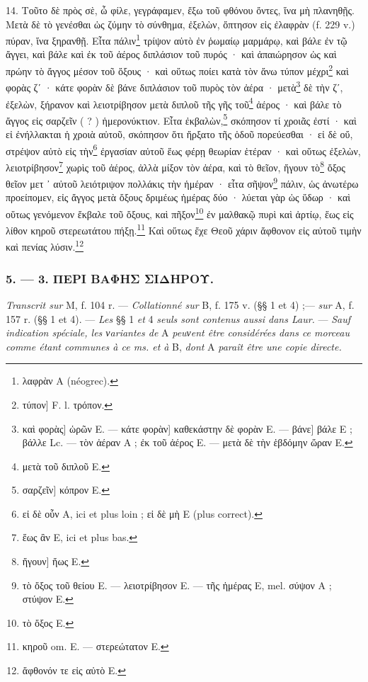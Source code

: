 \documentclass[a4paper, 11pt, oneside, polutonikogreek, french]{article}
\begin{document}
14. Τοῦτο δὲ πρὸς σὲ, ὦ φίλε, γεγράφαμεν, ἔξω τοῦ φθόνου ὄντες, ἵνα μὴ πλανηθῇς. Μετὰ δὲ τὸ γενέσθαι ὡς ζύμην τὸ σύνθημα, ἐξελὼν, ὄπτησον εἰς ἐλαφρὰν (f. 229 v.) πύραν, ἵνα ξηρανθῇ. Εἶτα πάλιν\footnote{λαφρὰν A (néogrec).} τρίψον αὐτὸ ἐν ῥωμαίῳ μαρμάρῳ, καὶ βάλε ἐν τῷ ἄγγει, καὶ βάλε καὶ ἐκ τοῦ ἀέρος διπλάσιον τοῦ πυρός · καὶ ἀπαιώρησον ὡς καὶ πρώην τὸ ἄγγος μέσον τοῦ ὄξους · καὶ οὕτως ποίει κατὰ τὸν ἄνω τύπον μέχρι\footnote{τύπον] F. l. τρόπον.} καὶ φορὰς ζʹ · κάτε φορὰν δὲ βάνε διπλάσιον τοῦ πυρὸς τὸν ἀέρα · μετὰ\footnote{καὶ φορὰς] ὡρῶν E. --- κάτε φορὰν] καθεκάστην δὲ φορὰν E. --- βάνε] βάλε E ; βάλλε Lc. --- τὸν ἀέραν A ; ἐκ τοῦ ἀέρος E. --- μετὰ δὲ τὴν ἑβδόμην ὥραν E.} δὲ τὴν ζʹ, ἐξελὼν, ξήρανον καὶ λειοτρίβησον μετὰ διπλοῦ τῆς γῆς τοῦ\footnote{μετὰ τοῦ διπλοῦ E.} ἀέρος · καὶ βάλε τὸ ἄγγος εἰς σαρζεῖν ( ? ) ἡμερονύκτιον. Εἶτα ἐκβαλὼν,\footnote{σαρζεῖν] κόπρον E.} σκόπησον τί χροιᾶς ἐστί · καὶ εἰ ἐνήλλακται ἡ χροιὰ αὐτοῦ, σκόπησον ὅτι ἤρξατο τῆς ὁδοῦ πορεύεσθαι · εἰ δὲ οὔ, στρέψον αὐτὸ εἰς τὴν\footnote{εἰ δὲ οὗν A, ici et plus loin ; εἰ δὲ μὴ E (plus correct).} ἐργασίαν αὐτοῦ ἕως φέρῃ θεωρίαν ἑτέραν · καὶ οὕτως ἐξελὼν, λειοτρίβησον\footnote{ἕως ἂν E, ici et plus bas.} χωρὶς τοῦ ἀέρος, ἀλλὰ μίξον τὸν ἀέρα, καὶ τὸ θεῖον, ἤγουν τὸ\footnote{ἤγουν] ἤως E.} ὄξος θεῖον μετ ᾽ αὐτοῦ λειότριψον πολλάκις τὴν ἡμέραν · εἶτα σῆψον\footnote{τὸ ὄξος τοῦ θείου E. --- λειοτρίβησον E. --- τῆς ἡμέρας E, mel. σύψον A ; στύψον E.} πάλιν, ὡς ἀνωτέρω προείπομεν, εἰς ἄγγος μετὰ ὄξους δριμέως ἡμέρας δύο · λύεται γὰρ ὡς ὕδωρ · καὶ οὕτως γενόμενον ἔκβαλε τοῦ ὄξους, καὶ πῆξον\footnote{τὸ ὄξος E.} ἐν μαλθακῷ πυρὶ καὶ ἀρτίῳ, ἕως εἰς λίθον κηροῦ στερεωτάτου πήξῃ.\footnote{κηροῦ om. E. --- στερεώτατον E.} Καὶ οὕτως ἔχε Θεοῦ χάριν ἄφθονον εἰς αὐτοῦ τιμὴν καὶ πενίας λύσιν.\footnote{ἄφθονόν τε εἰς αὐτὸ E.}

\bigskip
\centerline{\EightStarTaper}
\centerline{\EightStarTaper\EightStarTaper}
\bigskip

\subsubsection{5. --- 3. ΠΕΡΙ ΒΑΦΗΣ ΣΙΔΗΡΟΥ.}

\emph{Transcrit sur} M, f. 104 r. --- \emph{Collationné sur} B, f. 175 v. (§§ 1 et 4) ;--- \emph{sur} A, f. 157 r. (§§ 1 et 4). --- \emph{Les} §§ 1 \emph{et} 4 \emph{seuls sont contenus aussi dans Laur.} --- \emph{Sauf indication spéciale, les νariantes de} A \emph{peuνent être considérées dans ce morceau comme étant communes à ce ms. et à} B, \emph{dont} A \emph{paraît être une copie directe.}
\end{document}
